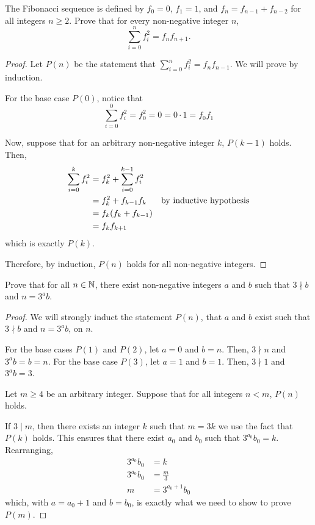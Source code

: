 \question The Fibonacci sequence is defined by $f_0=0$, $f_1=1$,
and $f_n=f_{n-1}+f_{n-2}$ for all integers $n \geq 2$.
Prove that for every non-negative integer $n$,
\[ \sum_{i=0}^n f^2_i = f_n f_{n+1}.\]
\begin{proof}
  Let $P(n)$ be the statement that $\displaystyle\sum_{i=0}^n f^2_i = f_n f_{n-1}$.
  We will prove by induction.

  For the base case $P(0)$, notice that
  \[ \sum_{i=0}^0 f_i^2 = f_0^2 = 0 = 0\cdot 1 = f_0 f_1 \]

  Now, suppose that for an arbitrary non-negative integer $k$, $P(k-1)$ holds. Then,
  \begin{align*}
    \sum_{i=0}^k f^2_i & = f_k^2 + \sum_{i=0}^{k-1} f^2_i \\
                       & = f_k^2 + f_{k-1} f_k & \text{by inductive hypothesis}        \\
                       & = f_k(f_k + f_{k-1})             \\
                       & = f_k f_{k+1}
  \end{align*}
  which is exactly $P(k)$.

  Therefore, by induction, $P(n)$ holds for all non-negative integers.
\end{proof}


\question Prove that for all $n\in\mathbb{N}$, there exist non-negative integers $a$ and $b$ such that
$3 \nmid b$ and $n = 3^a b$.
\begin{proof}
  We will strongly induct the statement $P(n)$, that $a$ and $b$ exist such that $3 \nmid b$ and $n=3^a b$, on $n$.

  For the base cases $P(1)$ and $P(2)$, let $a=0$ and $b=n$.
  Then, $3 \nmid n$ and $3^a b = b = n$.
  For the base case $P(3)$, let $a=1$ and $b=1$.
  Then, $3 \nmid 1$ and $3^a b = 3$.

  Let $m \geq 4$ be an arbitrary integer.
  Suppose that for all integers $n < m$, $P(n)$ holds.

  If $3 \mid m$, then there exists an integer $k$ such that $m=3k$ we use the fact that $P(k)$ holds.
  This ensures that there exist $a_0$ and $b_0$ such that $3^{a_0}b_0 = k$. Rearranging,
  \begin{align*}
    3^{a_0}b_0 & = k            \\
    3^{a_0}b_0 & = \frac{m}{3}  \\
    m          & = 3^{a_0+1}b_0
  \end{align*}
  which, with $a=a_0+1$ and $b=b_0$, is exactly what we need to show to prove $P(m)$.
\end{proof}

